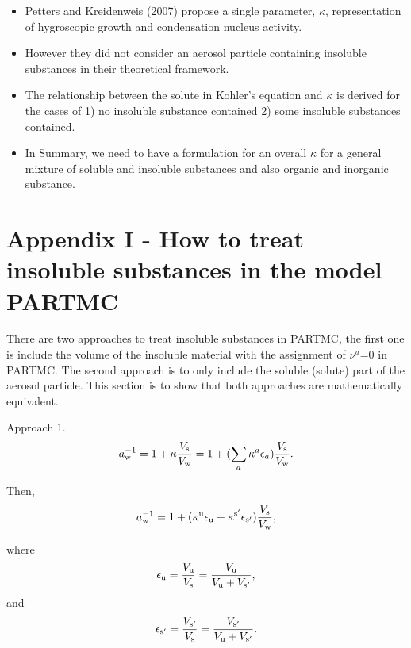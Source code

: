 \documentclass[12pt]{article}
\begin{document}
\begin{itemize}
\item Petters and Kreidenweis (2007) propose a single parameter, $\kappa$, representation of hygroscopic growth and condensation nucleus activity.

\item However they did not consider an aerosol particle containing insoluble substances in their theoretical framework.

\item The relationship between the solute in Kohler's equation and $\kappa$ is derived for the cases of 1) no insoluble substance contained 2) some insoluble substances contained.  

\item In Summary, we need to have a formulation for an overall $\kappa$ for a general mixture of soluble and insoluble substances and also organic and inorganic substance. 
 
\end{itemize}

\section{Appendix I - How to treat insoluble substances in the model PARTMC}

There are two approaches to treat insoluble substances in PARTMC, the first one is include the volume of the insoluble material with the assignment of $\nu^{u}$=$0$ in PARTMC. The second approach is to only include the soluble (solute) part of the aerosol particle. This section is to show that both approaches are mathematically equivalent.
 
Approach 1. 
\begin{equation}\label{eqn:32}
a_{\rm w}^{-1}=1+\kappa \frac{V_{\rm s}}{V_{\rm w}}=1+ (\sum_{a} \kappa^{a} \epsilon_{a})\frac{V_{\rm s}}{V_{\rm w}}.
\end{equation}

Then,
\begin{equation}\label{eqn:33}
a_{\rm w}^{-1}=1+ (\kappa^{\rm u} \epsilon_{\rm u} +\kappa^{\rm s'} \epsilon_{\rm s'}) \frac{V_{\rm s}}{V_{\rm w}},
\end{equation}

where
\begin{equation}\label{eqn:34}
\epsilon_{\rm u}=\frac{V_{\rm u}}{V_{\rm s}}=\frac{V_{\rm u}}{V_{\rm u}+V_{\rm s'}},
\end{equation}
and
\begin{equation}\label{eqn:35}
\epsilon_{\rm s'}=\frac{V_{\rm s'}}{V_{\rm s}}=\frac{V_{\rm s'}}{V_{\rm u}+V_{\rm s'}}.
\end{equation}
\end{document}
